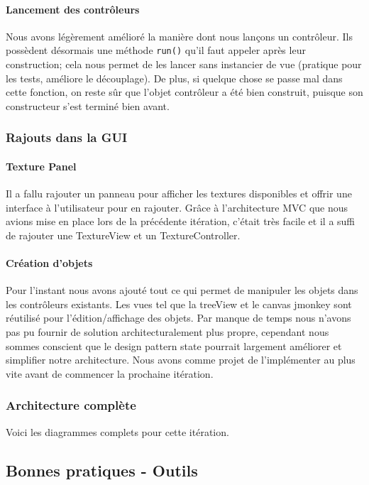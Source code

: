 		\paragraph{Lancement des contrôleurs}
		Nous avons légèrement amélioré la manière dont nous lançons un contrôleur.
		Ils possèdent désormais une méthode \texttt{run()} qu'il faut appeler
		après leur construction; cela nous permet de les lancer sans instancier
		de vue (pratique pour les tests, améliore le découplage). De plus, si 
		quelque chose se passe mal dans cette fonction, on reste sûr que 
		l'objet contrôleur a été bien construit, puisque son constructeur s'est
		terminé bien avant. 

	\subsubsection{Rajouts dans la GUI}

		\paragraph{Texture Panel}
		Il a fallu rajouter un panneau pour afficher les textures disponibles et
		offrir une interface à l'utilisateur pour en rajouter. Grâce à 
		l'architecture MVC que nous avions mise en place lors de la précédente 
		itération, c'était très facile et il a suffi de rajouter une TextureView
		et un TextureController.

		\paragraph{Création d'objets}
		Pour l'instant nous avons ajouté tout ce qui permet de manipuler les objets dans les contrôleurs existants. Les vues tel que la treeView et le canvas jmonkey sont réutilisé pour l'édition/affichage des objets. Par manque de temps nous n'avons pas pu fournir de solution architecturalement plus propre, cependant nous sommes conscient que le design pattern state pourrait largement améliorer et simplifier notre architecture. Nous avons comme projet de l'implémenter au plus vite avant de commencer la prochaine itération.

	\subsubsection{Architecture complète}
	Voici les diagrammes complets pour cette itération.


\subsection{Bonnes pratiques - Outils}

